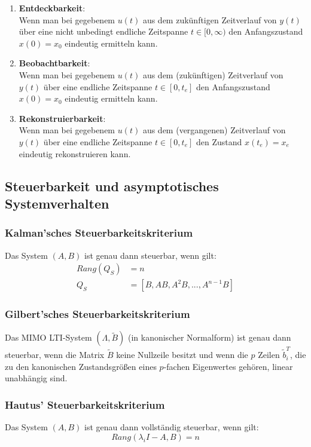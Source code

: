 \documentclass[a4paper,twocolumn,10pt]{article}
\begin{document}
\begin{enumerate}[label=$\bullet$]
\item \textbf{Entdeckbarkeit}:\\
Wenn man bei gegebenem $u(t)$ aus dem zukünftigen Zeitverlauf von $y(t)$ über eine nicht unbedingt endliche Zeitspanne $t\in[0,\infty)$ den Anfangszustand $x(0)=x_0$ eindeutig ermitteln kann.
\item \textbf{Beobachtbarkeit}:\\
Wenn man bei gegebenem $u(t)$ aus dem (zukünftigen) Zeitverlauf von $y(t)$ über eine endliche Zeitspanne $t\in[0,t_e]$ den Anfangszustand $x(0)=x_0$ eindeutig ermitteln kann.
\item \textbf{Rekonstruierbarkeit}:\\
Wenn man bei gegebenem $u(t)$ aus dem (vergangenen) Zeitverlauf von $y(t)$ über eine endliche Zeitspanne $t\in[0,t_e]$ den Zustand $x(t_e)=x_e$ eindeutig rekonstruieren kann.
\end{enumerate}

\subsection{Steuerbarkeit und asymptotisches Systemverhalten}
\subsubsection{Kalman'sches Steuerbarkeitskriterium}
Das System $(A,B)$ ist genau dann steuerbar, wenn gilt:
\begin{align*}
Rang(Q_S)&=n\\
Q_S&=\left[B,AB,A^2B,...,A^{n-1}B\right]
\end{align*}

\subsubsection{Gilbert'sches Steuerbarkeitskriterium}
Das MIMO LTI-System $(\Lambda, \tilde{B})$ (in kanonischer Normalform) ist genau dann steuerbar, wenn die Matrix $\tilde{B}$ keine Nullzeile besitzt und wenn die $p$ Zeilen $\tilde{b}_i^T$, die zu den kanonischen Zustandsgrößen eines $p$-fachen Eigenwertes gehören, linear unabhängig sind.

\subsubsection{Hautus' Steuerbarkeitskriterium}
Das System $(A,B)$ ist genau dann vollständig steuerbar, wenn gilt:
\begin{equation*}
Rang(\lambda_iI-A,B)=n
\end{equation*}
\end{document}

